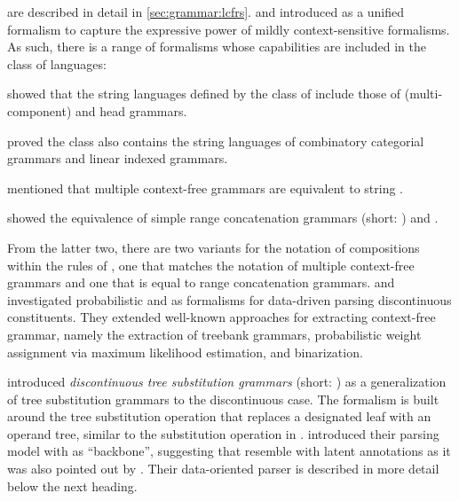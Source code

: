 \documentclass[../document.tex]{subfiles}
\begin{document}
      are described in detail in \cref{sec:grammar:lcfrs}.
     and \citet{Weir88} introduced  as a unified formalism to capture the expressive power of mildly context-sensitive formalisms.
    As such, there is a range of formalisms whose capabilities are included in the class of  languages:
    \begin{compactitem}
        \item \citet{VijWeiJos87} showed that the string languages defined by the class of  include those of (multi-component)  and head grammars.
        \item \citet{vijay1994equivalence} proved the class also contains the string languages of combinatory categorial grammars and linear indexed grammars.
        \item \citet{SekMatFujKas91} mentioned that multiple context-free grammars are equivalent to string .
        \item \citet{boullier1998proposal} showed the equivalence of simple range concatenation grammars (short: ) and .
    \end{compactitem}
    From the latter two, there are two variants for the notation of compositions within the rules of , one that matches the notation of multiple context-free grammars and one that is equal to range concatenation grammars.
     and \citet{MailKal10} investigated probabilistic  and  as formalisms for data-driven parsing discontinuous constituents.
    They extended well-known approaches for extracting context-free grammar, namely the extraction of treebank grammars, probabilistic weight assignment via maximum likelihood estimation, and binarization.

     introduced \emph{discontinuous tree substitution grammars} (short: ) as a generalization of tree substitution grammars to the discontinuous case.
    The formalism is built around the tree substitution operation that replaces a designated leaf with an operand tree, similar to the substitution operation in .
     introduced their parsing model with  as ``backbone'', suggesting that  resemble  with latent annotations as it was also pointed out by \citet[Section~8.5.1]{Geb20}.
    Their data-oriented parser is described in more detail below the next heading.
\end{document}
